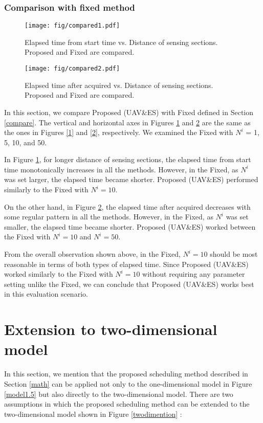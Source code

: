\documentclass[journal]{IEEEtran}
\begin{document}
\subsubsection{Comparison with fixed method}

\begin{figure}[t]
\begin{center}
\texttt{[image: fig/compared1.pdf]}
\caption{Elapsed time from start time vs. Distance of sensing sections. Proposed and Fixed are compared.}
\label{3}
\end{center}
\end{figure}

\begin{figure}[t]
\begin{center}
\texttt{[image: fig/compared2.pdf]}
\caption{Elapsed time after acquired vs. Distance of sensing sections. Proposed and Fixed are compared.}
\label{4}
\end{center}
\end{figure}

In this section, we compare Proposed (UAV\&ES) with Fixed defined in Section \ref{compare}.
%
The vertical and horizontal axes in Figures \ref{3} and \ref{4} are the same as the ones in Figures \ref{1} and \ref{2}, respectively.
%
We examined the Fixed with $N^i$ = 1, 5, 10, and 50.

%
In Figure \ref{3}, for longer distance of sensing sections, the elapsed time from start time monotonically increases in all the methods.
%
However, in the Fixed, as $N^i$ was set larger, the elapsed time became shorter.
%
Proposed (UAV\&ES) performed similarly to the Fixed with $N^i=10$.

On the other hand, in Figure \ref{4}, the elapsed time after acquired decreases with some regular pattern in all the methods.
%
However, in the Fixed, as $N^i$ was set smaller, the elapsed time became shorter.
%
Proposed (UAV\&ES) worked between the Fixed with $N^i=10$ and $N^i=50$.

From the overall observation shown above, in the Fixed, $N^i=10$ should be most reasonable in terms of both types of elapsed time.
%
Since Proposed (UAV\&ES) worked similarly to the Fixed with $N^i=10$ without requiring any parameter setting unlike the Fixed, we can conclude that Proposed (UAV\&ES) works best in this evaluation scenario.


\section{Extension to two-dimensional model}\label{twodi}
In this section, we mention that the proposed scheduling method described in Section \ref{math} can be applied not only to the one-dimensional model in Figure \ref{model1.5} but also directly to the two-dimensional model.
There are two assumptions in which the proposed scheduling method can be extended to the two-dimensional model shown in Figure \ref{twodimention} :
\end{document}
